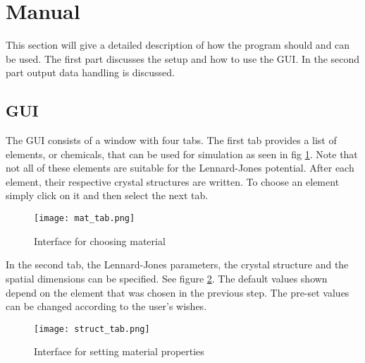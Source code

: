 \section{Manual}
This section will give a detailed description of how the program should and can be used. The first part discusses the setup and how to use the GUI. In the second part output data handling is discussed.
	\subsection{GUI}
The GUI consists of a window with four tabs. The first tab provides a list of elements, or chemicals, that can be used for simulation as seen in fig \ref{fig:mat_tab}. Note that not all of these elements are suitable for the Lennard-Jones potential. After each element, their respective crystal structures are written. To choose an element simply click on it and then select the next tab.
\begin{figure}[h!]
	\centering
	\texttt{[image: mat\_tab.png]}
	\caption{Interface for choosing material}
	\label{fig:mat_tab}
\end{figure}
In the second tab, the Lennard-Jones parameters, the crystal structure and the spatial dimensions can be specified. See figure \ref{fig:struct_tab}. The default values shown depend on the element that was chosen in the previous step. The pre-set values can be changed according to the user's wishes.
\begin{figure}[h!]
	\centering
	\texttt{[image: struct\_tab.png]}
	\caption{Interface for setting material properties}
	\label{fig:struct_tab}
\end{figure}

